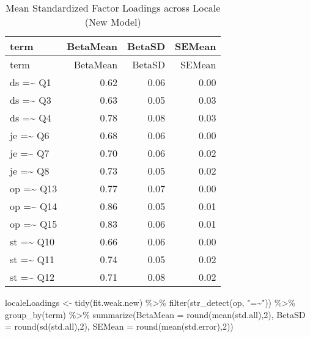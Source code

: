 \documentclass[
  letterpaper,
  DIV=11,
  numbers=noendperiod]{scrartcl}
\newenvironment{Shaded}{\begin{snugshade}}{\end{snugshade}}
\newcommand{\AttributeTok}[1]{\textcolor[rgb]{0.40,0.45,0.13}{#1}}
\newcommand{\DecValTok}[1]{\textcolor[rgb]{0.68,0.00,0.00}{#1}}
\newcommand{\FunctionTok}[1]{\textcolor[rgb]{0.28,0.35,0.67}{#1}}
\newcommand{\NormalTok}[1]{\textcolor[rgb]{0.00,0.23,0.31}{#1}}
\newcommand{\OtherTok}[1]{\textcolor[rgb]{0.00,0.23,0.31}{#1}}
\newcommand{\SpecialCharTok}[1]{\textcolor[rgb]{0.37,0.37,0.37}{#1}}
\newcommand{\StringTok}[1]{\textcolor[rgb]{0.13,0.47,0.30}{#1}}
\begin{document}
\begin{longtable}[]{@{}lrrr@{}}
\caption{Mean Standardized Factor Loadings across Locale (New
Model)}\tabularnewline
\toprule\noalign{}
term & BetaMean & BetaSD & SEMean \\
\midrule\noalign{}
\endfirsthead
\toprule\noalign{}
term & BetaMean & BetaSD & SEMean \\
\midrule\noalign{}
\endhead
\bottomrule\noalign{}
\endlastfoot
ds =\textasciitilde{} Q1 & 0.62 & 0.06 & 0.00 \\
ds =\textasciitilde{} Q3 & 0.63 & 0.05 & 0.03 \\
ds =\textasciitilde{} Q4 & 0.78 & 0.08 & 0.03 \\
je =\textasciitilde{} Q6 & 0.68 & 0.06 & 0.00 \\
je =\textasciitilde{} Q7 & 0.70 & 0.06 & 0.02 \\
je =\textasciitilde{} Q8 & 0.73 & 0.05 & 0.02 \\
op =\textasciitilde{} Q13 & 0.77 & 0.07 & 0.00 \\
op =\textasciitilde{} Q14 & 0.86 & 0.05 & 0.01 \\
op =\textasciitilde{} Q15 & 0.83 & 0.06 & 0.01 \\
st =\textasciitilde{} Q10 & 0.66 & 0.06 & 0.00 \\
st =\textasciitilde{} Q11 & 0.74 & 0.05 & 0.02 \\
st =\textasciitilde{} Q12 & 0.71 & 0.08 & 0.02 \\
\end{longtable}

\begin{Shaded}
\begin{Highlighting}[]
\NormalTok{localeLoadings }\OtherTok{\textless{}{-}} \FunctionTok{tidy}\NormalTok{(fit.weak.new) }\SpecialCharTok{\%\textgreater{}\%}
  \FunctionTok{filter}\NormalTok{(}\FunctionTok{str\_detect}\NormalTok{(op, }\StringTok{"=\textasciitilde{}"}\NormalTok{)) }\SpecialCharTok{\%\textgreater{}\%}
  \FunctionTok{group\_by}\NormalTok{(term) }\SpecialCharTok{\%\textgreater{}\%}
  \FunctionTok{summarize}\NormalTok{(}\AttributeTok{BetaMean =} \FunctionTok{round}\NormalTok{(}\FunctionTok{mean}\NormalTok{(std.all),}\DecValTok{2}\NormalTok{), }
            \AttributeTok{BetaSD =} \FunctionTok{round}\NormalTok{(}\FunctionTok{sd}\NormalTok{(std.all),}\DecValTok{2}\NormalTok{), }
            \AttributeTok{SEMean =} \FunctionTok{round}\NormalTok{(}\FunctionTok{mean}\NormalTok{(std.error),}\DecValTok{2}\NormalTok{))}
\end{Highlighting}
\end{Shaded}
\end{document}
